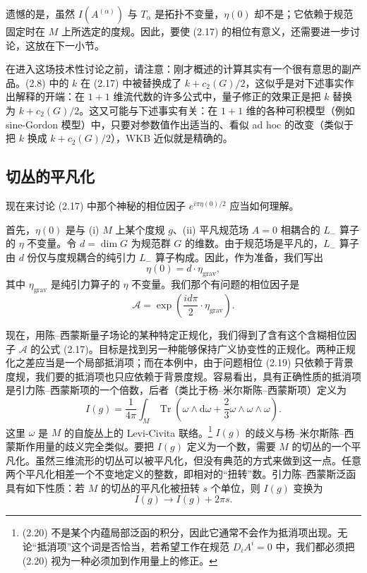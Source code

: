 \documentclass[11pt,a4paper]{article}
\begin{document}
遗憾的是，虽然 $I(A^{(\alpha)})$ 与 $T_\alpha$ 是拓扑不变量，$\eta(0)$ 却不是；它依赖于规范固定时在 $M$ 上所选定的度规。因此，要使 (2.17) 的相位有意义，还需要进一步讨论，这放在下一小节。

在进入这场技术性讨论之前，请注意：刚才概述的计算其实有一个很有意思的副产品。(2.8) 中的 $k$ 在 (2.17) 中被替换成了 $k+c_2(G)/2$，这似乎是对下述事实作出解释的开端：在 $1+1$ 维流代数的许多公式中，量子修正的效果正是把 $k$ 替换为 $k+c_2(G)/2$。这又可能与下述事实有关：在 $1+1$ 维的各种可积模型（例如 sine-Gordon 模型）中，只要对参数值作出适当的、看似 ad hoc 的改变（类似于把 $k$ 换成 $k+c_2(G)/2$），WKB 近似就是精确的。

\subsection*{切丛的平凡化}

现在来讨论 (2.17) 中那个神秘的相位因子 $e^{i\pi\eta(0)/2}$ 应当如何理解。

首先，$\eta(0)$ 是与 (i) $M$ 上某个度规 $g$、(ii) 平凡规范场 $A=0$ 相耦合的 $L_-$ 算子的 $\eta$ 不变量。令 $d=\dim G$ 为规范群 $G$ 的维数。由于规范场是平凡的，$L_-$ 算子由 $d$ 份仅与度规耦合的纯引力 $L_-$ 算子构成。因此，作为准备，我们写出
\begin{equation}
    \eta(0)=d\cdot\eta_{\mathrm{grav}},
    \tag{2.18}
\end{equation}
其中 $\eta_{\mathrm{grav}}$ 是纯引力算子的 $\eta$ 不变量。我们那个有问题的相位因子是
\begin{equation}
    \mathcal{A}=\exp\left(\frac{id\pi}{2}\cdot\eta_{\mathrm{grav}}\right).
    \tag{2.19}
\end{equation}

现在，用陈–西蒙斯量子场论的某种特定正规化，我们得到了含有这个含糊相位因子 $\mathcal{A}$ 的公式 (2.17)。目标是找到另一种能够保持广义协变性的正规化。两种正规化之差应当是一个局部抵消项；而在本例中，由于问题相位 (2.19) 只依赖于背景度规，我们要的抵消项也只应依赖于背景度规。容易看出，具有正确性质的抵消项是引力陈–西蒙斯项的一个倍数，后者（类比于杨--米尔斯陈–西蒙斯项）定义为
\begin{equation}
    I(g)=\frac{1}{4\pi}\int_M\operatorname{Tr}\left(\omega\wedge\mathrm{d}\omega+\frac{2}{3}\omega\wedge\omega\wedge\omega\right).
    \tag{2.20}
\end{equation}
这里 $\omega$ 是 $M$ 的自旋丛上的 Levi-Civita 联络。\footnote{(2.20) 不是某个内蕴局部泛函的积分，因此它通常不会作为抵消项出现。无论“抵消项”这个词是否恰当，若希望工作在规范 $D_iA^i=0$ 中，我们都必须把 (2.20) 视为一种必须加到作用量上的修正。} $I(g)$ 的歧义与杨--米尔斯陈–西蒙斯作用量的歧义完全类似。要把 $I(g)$ 定义为一个数，需要 $M$ 的切丛的一个平凡化。虽然三维流形的切丛可以被平凡化，但没有典范的方式来做到这一点。任意两个平凡化相差一个不变地定义的整数，即相对的“扭转”数。引力陈–西蒙斯泛函具有如下性质：若 $M$ 的切丛的平凡化被扭转 $s$ 个单位，则 $I(g)$ 变换为
\begin{equation}
    I(g)\to I(g)+2\pi s.
    \tag{2.21}
\end{equation}
\end{document}
